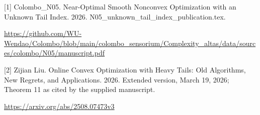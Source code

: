\documentclass[10pt,a4paper]{article}
\begin{document}
[1] Colombo\_N05. Near-Optimal Smooth Nonconvex Optimization with an Unknown Tail Index. 2026. N05\_unknown\_tail\_index\_publication.tex.



\url{https://github.com/WU-Wendao/Colombo/blob/main/colombo_sensorium/Complexity_altas/data/sources/colombo/N05/manuscript.pdf}



[2] Zijian Liu. Online Convex Optimization with Heavy Tails: Old Algorithms, New Regrets, and Applications. 2026. Extended version, March 19, 2026; Theorem 11 as cited by the supplied manuscript.



\url{https://arxiv.org/abs/2508.07473v3}
\end{document}
